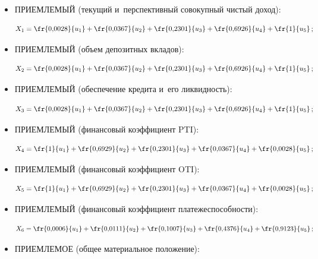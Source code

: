   \begin{itemize}

\item ПРИЕМЛЕМЫЙ (текущий и~перспективный совокупный чистый доход): 

$$

X_1=\fr{0{,}0028}{u_1}+\fr{0{,}0367}{u_2}+\fr{0{,}2301}{u_3}+\fr{0{,}6926}

{u_4}+\fr{1}{u_5}\,;

$$

\item ПРИЕМЛЕМЫЙ (объем депозитных вкладов): 

$$

X_2=\fr{0{,}0028}{u_1}+\fr{0{,}0367}{u_2}+\fr{0{,}2301}{u_3}+\fr{0{,}6926}

{u_4}+\fr{1}{u_5}\,;

$$

\item ПРИЕМЛЕМЫЙ (обеспечение кредита и~его ликвидность): 

$$

X_3=\fr{0{,}0028}{u_1}+\fr{0{,}0367}{u_2}+\fr{0{,}2301}{u_3}+\fr{0{,}6926}

{u_4}+\fr{1}{u_5}\,;

$$

\item ПРИЕМЛЕМЫЙ (финансовый коэффициент PTI): 

$$

X_4= \fr{1}{u_1} 

+\fr{0{,}6929}{u_2}+\fr{0{,}2301}{u_3}+\fr{0{,}0367}{u_4}+\fr{0{,}0028}{u_5}\,;

$$

\item ПРИЕМЛЕМЫЙ (финансовый коэффициент OTI): 

$$

X_5= \fr{1}{u_1} 

+\fr{0{,}6929}{u_2}+\fr{0{,}2301}{u_3}+\fr{0{,}0367}{u_4}+\fr{0{,}0028}{u_5}\,;

$$

\item ПРИЕМЛЕМЫЙ (финансовый коэффициент платежеспособности): 

$$

X_6= \fr{0{,}0006}{u_1} 

+\fr{0{,}0111}{u_2}+\fr{0{,}1007}{u_3}+\fr{0{,}4376}{u_4}+\fr{0{,}9123}{u_5}\,;

$$

\item ПРИЕМЛЕМОЕ (общее материальное положение): 


\end{itemize}
